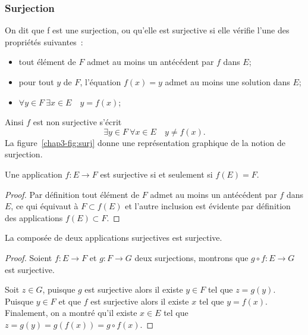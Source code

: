 \subsubsection{Surjection}
\label{chap3-subsubsec:surjection}
\begin{defdef}
  On dit que f est une surjection, ou qu'elle est surjective si elle vérifie l'une des propriétés suivantes~:
  \begin{itemize}
  \item tout élément de \(F\) admet au moins un antécédent par \(f\) dans \(E\);
  \item pour tout \(y\) de \(F\), l'équation \(f(x)=y\) admet au moins une solution dans \(E\);
  \item \(\forall y \in F \ \exists x \in E \quad y=f(x)\);
  \end{itemize}
  Ainsi \(f\) est non surjective s'écrit
  \begin{equation}
    \exists y \in F \ \forall x \in E \quad y \neq f(x).
  \end{equation}
  La figure~\ref{chap3-fig:surj} donne une représentation graphique de la notion de surjection.
\end{defdef}
\begin{prop}
  Une application \(f:E \longrightarrow F\) est surjective si et seulement si \(f(E)=F\).
\end{prop}
\begin{proof}
    Par définition tout élément de \(F\) admet au moins un antécédent par \(f\) dans \(E\), ce qui équivaut à \(F \subset f(E)\) et l'autre inclusion est évidente par définition des applications \(f(E) \subset F\).
\end{proof}
\begin{theo}
  La composée de deux applications surjectives est surjective.
\end{theo}
\begin{proof}
  Soient \(f:E \longrightarrow F\) et \(g:F \longrightarrow G\) deux surjections, montrons que \(g \circ f: E \longrightarrow G\) est surjective. 

  Soit \(z \in G\), puisque \(g\) est surjective alors il existe \(y \in F\) tel que \(z=g(y)\). Puisque \(y \in F\) et que \(f\) est surjective alors il existe \(x\) tel que \(y=f(x)\). Finalement, on a montré qu'il existe \(x \in E\) tel que \(z=g(y)=g(f(x))= g \circ f(x)\).
\end{proof}
